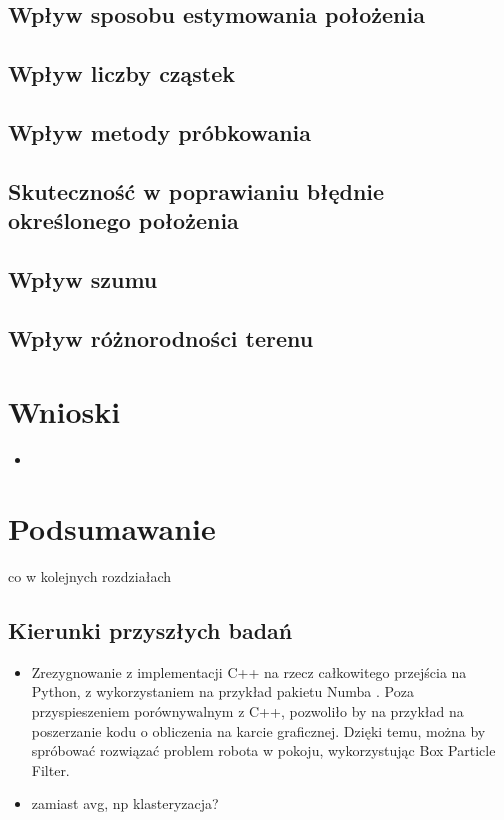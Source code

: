 \documentclass[10pt,a4paper]{article}
\begin{document}
\subsection{Wpływ sposobu estymowania położenia}
\subsection{Wpływ liczby cząstek}
\subsection{Wpływ metody próbkowania}
\subsection{Skuteczność w poprawianiu błędnie określonego położenia}
\subsection{Wpływ szumu}
\subsection{Wpływ różnorodności terenu}

\section{Wnioski}
\begin{itemize}
	\item 
\end{itemize}
\section{Podsumawanie}
co w kolejnych rozdziałach

\subsection{Kierunki przyszłych badań}
\begin{itemize}
	\item Zrezygnowanie z implementacji C++ na rzecz całkowitego przejścia na Python, z wykorzystaniem na przykład pakietu Numba \cite{numba}. Poza przyspieszeniem porównywalnym z C++, pozwoliło by na przykład na poszerzanie kodu o obliczenia na karcie graficznej. Dzięki temu, można by spróbować rozwiązać problem robota w pokoju, wykorzystując Box Particle Filter.
	\item zamiast avg, np klasteryzacja?
\end{itemize}



\end{document}
